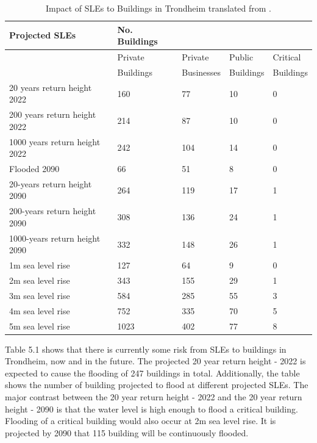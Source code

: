 \begin{table}[H]
    \centering
    \begin{tabular}{|l|l|l|l|l|}
    \hline
        \textbf{Projected SLEs }& \textbf{No. Buildings}  & ~ & ~ & ~ \\ \hline
        ~ & Private & Private & Public  & Critical  \\ \newline
        ~ & Buildings & Businesses & Buildings & Buildings \\ \hline        
        20 years return height 2022 & 160 & 77 & 10 & 0 \\ \hline
        200 years return height 2022 & 214 & 87 & 10 & 0 \\ \hline
        1000 years return height 2022 & 242 & 104 & 14 & 0 \\ \hline
        Flooded 2090 & 66 & 51 & 8 & 0 \\ \hline
        20-years return height 2090 & 264 & 119 & 17 & 1 \\ \hline
        200-years return height  2090 & 308 & 136 & 24 & 1 \\ \hline
        1000-years return height  2090 & 332 & 148 & 26 & 1 \\ \hline
        1m sea level rise & 127 & 64 & 9 & 0 \\ \hline
        2m sea level rise & 343 & 155 & 29 & 1 \\ \hline
        3m sea level rise & 584 & 285 & 55 & 3 \\ \hline
        4m sea level rise & 752 & 335 & 70 & 5 \\ \hline
        5m sea level rise & 1023 & 402 & 77 & 8 \\ \hline
    \end{tabular}
    \caption{Impact of SLEs to Buildings in Trondheim translated from \cite{kartverket_se_2021}.  }
    \label{building-impact-sle}
\end{table}


Table 5.1 shows that there is currently some risk from SLEs to buildings in Trondheim, now and in the future. The projected 20 year return height - 2022 is expected to cause the flooding of 247 buildings in total. Additionally, the table shows the number of building projected to flood at different projected SLEs. The major contrast between the 20 year return height - 2022 and the 20 year return height - 2090 is that the water level is high enough to flood a critical building. Flooding of a critical building would also occur at 2m sea level rise. It is projected by 2090 that 115 building will be continuously flooded.

